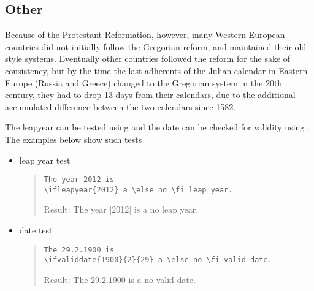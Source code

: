 

\subsection{Other}

Because of the Protestant Reformation, however, many Western European countries did not initially follow the Gregorian reform, and maintained their old-style systems. Eventually other countries followed the reform for the sake of consistency, but by the time the last adherents of the Julian calendar in Eastern Europe (Russia and Greece) changed to the Gregorian system in the 20th century, they had to drop 13 days from their calendars, due to the additional accumulated difference between the two calendars since 1582.

The leapyear  can be tested using
\cmd{\leapyear} and the date can be checked for validity using
\cmd{\ifvaliddate}. The examples below show such tests

\begin{itemize}
\item leap year test
\begin{quote}
\begin{verbatim}
The year 2012 is
 a \else no \fi leap year.
\end{verbatim}
Result: The year |2012| is  a \else no \fi leap year.
\end{quote}
\item date test
\begin{quote}
\begin{verbatim}
The 29.2.1900 is
 a \else no \fi valid date.
\end{verbatim}


Result: The 29.2.1900 is  a \else no \fi valid date.%
\end{quote}
\end{itemize}

